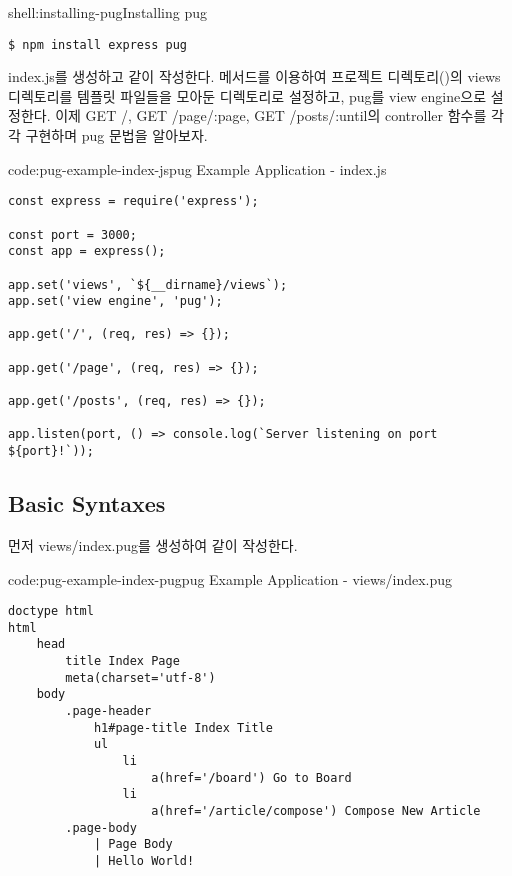 \begin{shellenv}{shell:installing-pug}{Installing pug}\begin{verbatim}
$ npm install express pug
\end{verbatim}
\end{shellenv}

index.js를 생성하고 \와 같이 작성한다.  메서드를 이용하여 프로젝트 디렉토리()의 views 디렉토리를 템플릿 파일들을 모아둔 디렉토리로 설정하고, pug를 view engine으로 설정한다. 이제 GET /, GET /page/:page, GET /posts/:until의 controller 함수를 각각 구현하며 pug 문법을 알아보자.

\begin{codeenv}{code:pug-example-index-js}{pug Example Application - index.js}\begin{verbatim}
const express = require('express');

const port = 3000;
const app = express();

app.set('views', `${__dirname}/views`);
app.set('view engine', 'pug');

app.get('/', (req, res) => {});

app.get('/page', (req, res) => {});

app.get('/posts', (req, res) => {});

app.listen(port, () => console.log(`Server listening on port ${port}!`));
\end{verbatim}
\end{codeenv}

\subsection*{Basic Syntaxes}

먼저 views/index.pug를 생성하여 \와 같이 작성한다.

\begin{codeenv}{code:pug-example-index-pug}{pug Example Application - views/index.pug}\begin{verbatim}
doctype html
html
    head
        title Index Page
        meta(charset='utf-8')
    body
        .page-header
            h1#page-title Index Title
            ul
                li
                    a(href='/board') Go to Board
                li
                    a(href='/article/compose') Compose New Article
        .page-body
            | Page Body
            | Hello World!
\end{verbatim}
\end{codeenv}

